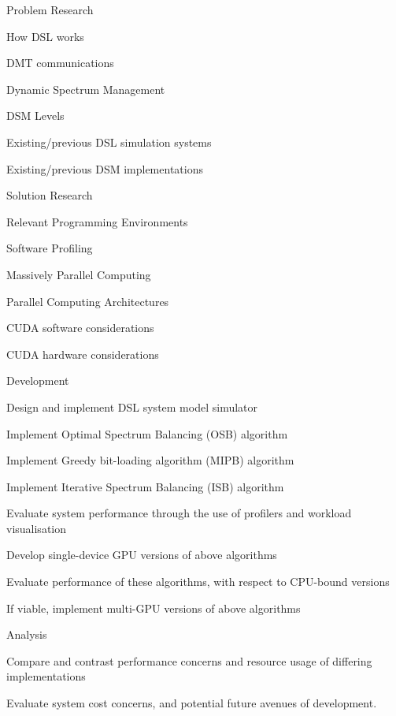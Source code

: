 \begin{itemize*}
 \setlength{\itemsep}{0.75pt}
 \setlength{\parskip}{0pt}
 \setlength{\parsep}{0pt}

 \item Problem Research
  \begin{itemize*}
   \item How DSL works
   \item DMT communications
   \item Dynamic Spectrum Management
   \item DSM Levels
   \item Existing/previous DSL simulation systems
   \item Existing/previous DSM implementations
  \end{itemize*}
 \item Solution Research
  \begin{itemize*}
   \item Relevant Programming Environments
   \item Software Profiling
   \item Massively Parallel Computing
   \item Parallel Computing Architectures
   \item CUDA software considerations
   \item CUDA hardware considerations
  \end{itemize*}
 \item Development
  \begin{itemize*}
   \item Design and implement DSL system model simulator
   \item Implement Optimal Spectrum Balancing (OSB) algorithm
   \item Implement Greedy bit-loading algorithm (MIPB) algorithm
   \item Implement Iterative Spectrum Balancing (ISB) algorithm
   \item Evaluate system performance through the use of profilers and workload visualisation
   \item Develop single-device GPU versions of above algorithms
   \item Evaluate performance of these algorithms, with respect to CPU-bound versions
   \item If viable, implement multi-GPU versions of above algorithms
  \end{itemize*}
 \item Analysis
   \begin{itemize*}
    \item Compare and contrast performance concerns and resource usage of differing implementations
    \item Evaluate system cost concerns, and potential future avenues of development.
   \end{itemize*}
\end{itemize*}
